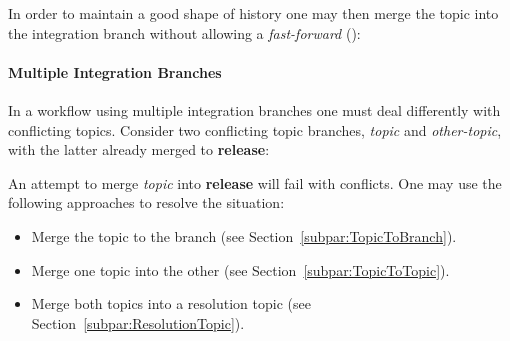 In order to maintain a good shape of history one may then merge the topic into
the integration branch without allowing a \textit{fast-forward}
():

\begin{figure}
\centering
{}
\label{fig:MergeDisallowingFF}
\end{figure}


\paragraph{Multiple Integration Branches}
\label{par:MultipleIntegrationBranches}

In a workflow using multiple integration branches one must deal differently with
conflicting topics. Consider two conflicting topic branches, \textit{topic} and
\textit{other-topic}, with the latter already merged to \textbf{release}:

\begin{figure}
\centering
{}
\label{fig:ConflictingTopicBranches2}
\end{figure}

An attempt to merge \textit{topic} into \textbf{release} will fail with
conflicts. One may use the following approaches to resolve the situation:
\begin{itemize}
\item Merge the topic to the branch (see Section~\ref{subpar:TopicToBranch}).
\item Merge one topic into the other (see Section~\ref{subpar:TopicToTopic}).
\item Merge both topics into a resolution topic (see
Section~\ref{subpar:ResolutionTopic}).
\end{itemize}

